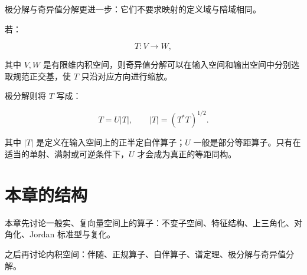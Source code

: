 极分解与奇异值分解更进一步：它们不要求映射的定义域与陪域相同。

若：

\[
T:V\to W,
\]

其中 $V,W$ 是有限维内积空间，则奇异值分解可以在输入空间和输出空间中分别选取规范正交基，使 $T$ 只沿对应方向进行缩放。

极分解则将 $T$ 写成：

\[
T=U|T|,
\qquad
|T|=(T^*T)^{1/2}.
\]

其中 $|T|$ 是定义在输入空间上的正半定自伴算子；$U$ 一般是部分等距算子。只有在适当的单射、满射或可逆条件下，$U$ 才会成为真正的等距同构。

\section*{本章的结构}

本章先讨论一般实、复向量空间上的算子：不变子空间、特征结构、上三角化、对角化、Jordan 标准型与复化。

之后再讨论内积空间：伴随、正规算子、自伴算子、谱定理、极分解与奇异值分解。
